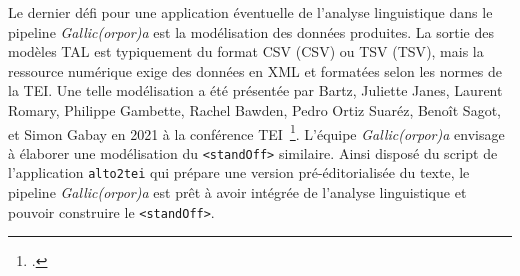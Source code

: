 \documentclass[class=article, crop=false]{standalone}
\begin{document}
Le dernier défi pour une application éventuelle de l'analyse linguistique dans le pipeline \textit{Gallic(orpor)a} est la modélisation des données produites. La sortie des modèles \acrshort{TAL} est typiquement du format \acrshort{CSV} (\acrlong{CSV}) ou \acrshort{TSV} (\acrlong{TSV}), mais la ressource numérique exige des données en \acrshort{XML} et formatées selon les normes de la \acrshort{TEI}. Une telle modélisation a été présentée par Bartz, Juliette Janes, Laurent Romary, Philippe Gambette, Rachel Bawden, Pedro Ortiz Suaréz, Benoît Sagot, et Simon Gabay en 2021 à la conférence TEI~\footcite{bartzExpandingContentModel2021}. L'équipe \textit{Gallic(orpor)a} envisage à élaborer une modélisation du \texttt{<standOff>} similaire. Ainsi disposé du script de l'application \texttt{alto2tei} qui prépare une version pré-éditorialisée du texte, le pipeline \textit{Gallic(orpor)a} est prêt à avoir intégrée de l'analyse linguistique et pouvoir construire le \texttt{<standOff>}.
\end{document}
